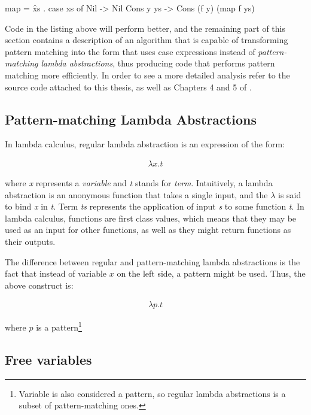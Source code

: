 \documentclass[12pt,a4paper]{report}
\begin{document}
\vspace*{0.2in}
\begin{code}[style=haskell,mathescape=true]
map = \f xs .
    case xs of
        Nil       -> Nil
        Cons y ys -> Cons (f y) (map f ys)
\end{code}

Code in the listing above will perform better, and the remaining part of this
section contains a description of an algorithm that is capable of transforming
pattern matching into the form that uses case expressions instead of
\textit{pattern-matching lambda abstractions}, thus producing code that
performs pattern matching more efficiently. In order to see a more detailed
analysis refer to the source code attached to this thesis, as well as Chapters
4 and 5 of \cite{Jon87}.

\subsection{Pattern-matching Lambda Abstractions}
In lambda calculus, regular lambda abstraction is an expression of the form:

\vspace{-0.2in}
\begin{align*}
\lambda x.t
\end{align*}

where \textit{x} represents a \textit{variable} and \textit{t} stands for
\textit{term}. Intuitively, a lambda abstraction is an anonymous function that
takes a single input, and the \(\lambda\) is said to bind \textit{x} in
\textit{t}. Term \textit{ts} represents the application of input \textit{s} to
some function \textit{t}. In lambda calculus, functions are first class values,
which means that they may be used as an input for other functions, as well as
they might return functions as their outputs.

The difference between regular and pattern-matching lambda abstractions is the
fact that instead of variable $x$ on the left side, a pattern might be used.
Thus, the above construct is:

\vspace{-0.2in}
\begin{align*}
\lambda p.t
\end{align*}


where $p$ is a pattern\footnote{Variable is also considered a pattern, so
regular lambda abstractions is a subset of pattern-matching ones.}

\subsection{Free variables}
\label{sec:free_variable}
\end{document}

